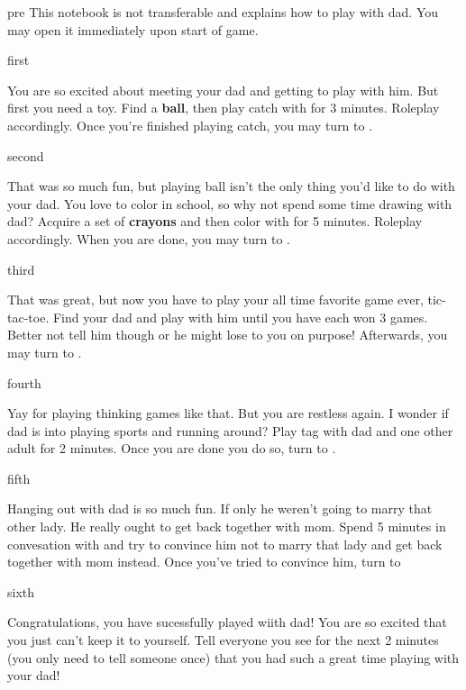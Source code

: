 \documentclass[notebook]{guildcamp1}
\begin{document}
\startnotebook{\nPlayWithDad{}}

\begin{page}{pre}
This notebook is not transferable and explains how to play with dad. You may open it immediately upon start of game.
\end{page}

\begin{page}{first}

You are so excited about meeting your dad and getting to play with him. But first you need a toy. Find a {\bf ball}, then play catch with \cGroomA{} for 3 minutes. Roleplay accordingly.  Once you're finished playing catch, you may turn to .

\end{page}

\begin{page}{second}

That was so much fun, but playing ball isn't the only thing you'd like to do with your dad.  You love to color in school, so why not spend some time drawing with dad?  Acquire a set of {\bf crayons} and then color with \cGroomA{} for 5 minutes. Roleplay accordingly. When you are done, you may turn to .

\end{page}

\begin{page}{third}

That was great, but now you have to play your all time favorite game ever, tic-tac-toe.  Find your dad and play with him until you have  each won 3 games.  Better not tell him though or he might lose to you on purpose! Afterwards, you may turn to .

\end{page}

\begin{page}{fourth}

Yay for playing thinking games like that. But you are restless again. I wonder if dad is into playing sports and running around? Play tag with dad and one other adult for 2 minutes. Once you are done you do so, turn to .

\end{page}

\begin{page}{fifth}

Hanging out with dad is so much fun. If only he weren't going to marry that other lady. He really ought to get back together with mom. Spend 5 minutes in convesation with \cGroomA{} and try to convince him not to marry that lady and get back together with mom instead. Once you've tried to convince him, turn to 

\end{page}

\begin{page}{sixth}

Congratulations, you have sucessfully played wiith dad! You are so excited that you just can't keep it to yourself. Tell everyone you see for the next 2 minutes (you only need to tell someone once) that you had such a great time playing with your dad!

\end{page}

\endnotebook
\end{document}
